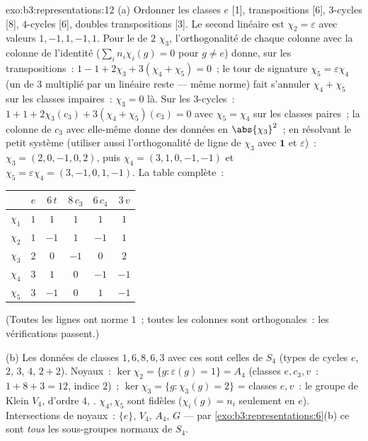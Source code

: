 \begin{solution}{exo:b3:representations:12}
(a) Ordonner les classes $e$ [1], transpositions [6],
$3$-cycles [8], $4$-cycles [6], doubles transpositions [3]. Le
second  linéaire est $\chi_2 = \varepsilon$ avec
valeurs $1, -1, 1, -1, 1$. Pour le  de  $2$
$\chi_3$, l'orthogonalité de chaque colonne avec la colonne de
l'identité ($\sum_in_i\chi_i(g) = 0$ pour $g \neq e$) donne, sur
les transpositions~: $1 - 1 + 2\chi_3 + 3(\chi_4 + \chi_5) =
0$~; le tour de signature $\chi_5 = \varepsilon\chi_4$ (un
 de  $3$ multiplié par un linéaire reste
 --- même norme) fait s'annuler $\chi_4 + \chi_5$
sur les classes impaires~: $\chi_3 = 0$ là. Sur les $3$-cycles~:
$1 + 1 + 2\chi_3(c_3) + 3(\chi_4 + \chi_5)(c_3) = 0$ avec
$\chi_5 = \chi_4$ sur les classes paires~; la colonne de $c_3$
avec elle-même donne des données en $\abs{\chi_3}^2$~; en
résolvant le petit système (utiliser aussi l'orthogonalité de
ligne de $\chi_3$ avec $\mathbf 1$ et $\varepsilon$)~: $\chi_3
= (2, 0, -1, 0, 2)$, puis $\chi_4 = (3, 1, 0, -1, -1)$ et
$\chi_5 = \varepsilon\chi_4 = (3, -1, 0, 1, -1)$. La table
complète~:
\begin{center}
\begin{tabular}{c|ccccc}
 & $e$ & $6\,t$ & $8\,c_3$ & $6\,c_4$ & $3\,v$\\
\hline
$\chi_1$ & $1$ & $1$ & $1$ & $1$ & $1$\\
$\chi_2$ & $1$ & $-1$ & $1$ & $-1$ & $1$\\
$\chi_3$ & $2$ & $0$ & $-1$ & $0$ & $2$\\
$\chi_4$ & $3$ & $1$ & $0$ & $-1$ & $-1$\\
$\chi_5$ & $3$ & $-1$ & $0$ & $1$ & $-1$\\
\end{tabular}
\end{center}
(Toutes les lignes ont norme $1$~; toutes les colonnes sont
orthogonales~: les vérifications passent.)

(b) Les données de classes $1, 6, 8, 6, 3$ avec ces  sont
celles de $S_4$ (types de cycles $e$, $2$, $3$, $4$, $2{+}2$).
Noyaux~: $\ker\chi_2 = \{g : \varepsilon(g) = 1\} = A_4$
(classes $e, c_3, v$~: $1 + 8 + 3 = 12$, indice $2$)~;
$\ker\chi_3 = \{g : \chi_3(g) = 2\}$ = classes $e, v$~: le
groupe de Klein $V_4$, d'ordre $4$, . $\chi_4, \chi_5$
sont fidèles ($\chi_i(g) = n_i$ seulement en $e$).
Intersections de noyaux~: $\{e\}$, $V_4$, $A_4$, $G$ --- par
\cref{exo:b3:representations:6}(b) ce sont \emph{tous} les
sous-groupes normaux de $S_4$.


\end{solution}
